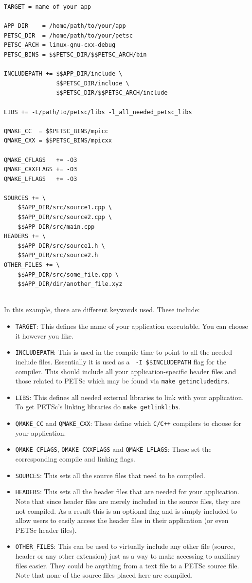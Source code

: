 {{{\begin{lstlisting}
TARGET = name_of_your_app

APP_DIR    = /home/path/to/your/app
PETSC_DIR  = /home/path/to/your/petsc
PETSC_ARCH = linux-gnu-cxx-debug
PETSC_BINS = $$PETSC_DIR/$$PETSC_ARCH/bin

INCLUDEPATH += $$APP_DIR/include \
               $$PETSC_DIR/include \
               $$PETSC_DIR/$$PETSC_ARCH/include

LIBS += -L/path/to/petsc/libs -l_all_needed_petsc_libs

QMAKE_CC  = $$PETSC_BINS/mpicc
QMAKE_CXX = $$PETSC_BINS/mpicxx

QMAKE_CFLAGS   += -O3
QMAKE_CXXFLAGS += -O3
QMAKE_LFLAGS   += -O3

SOURCES += \
	$$APP_DIR/src/source1.cpp \
	$$APP_DIR/src/source2.cpp \
	$$APP_DIR/src/main.cpp
HEADERS += \
	$$APP_DIR/src/source1.h \
	$$APP_DIR/src/source2.h 	
OTHER_FILES += \
	$$APP_DIR/src/some_file.cpp \
	$$APP_DIR/dir/another_file.xyz
	
\end{lstlisting}

In this example, there are different keywords used. These include:
\begin{itemize}
\item \texttt{TARGET}: This defines the name of your application executable. You can choose it however you like.
\item \texttt{INCLUDEPATH}: This is used in the compile time to point to all the needed include files. Essentially it is used as a \texttt{ -I \$\$INCLUDEPATH} flag for the compiler. This should include all your application-specific header files and those related to PETSc which may be found via \texttt{make getincludedirs}.
\item \texttt{LIBS}: This defines all needed external libraries to link with your application. To get PETSc's linking libraries do \texttt{make getlinklibs}.
\item \texttt{QMAKE\_CC} and \texttt{QMAKE\_CXX}: These define which \texttt{C/C++} compilers to choose for your application.
\item \texttt{QMAKE\_CFLAGS}, \texttt{QMAKE\_CXXFLAGS} and \texttt{QMAKE\_LFLAGS}: These set the corresponding compile and linking flags.
\item \texttt{SOURCES}: This sets all the source files that need to be compiled.
\item \texttt{HEADERS}: This sets all the header files that are needed for your application. Note that since header files are merely included in the source files, they are not compiled. As a result this is an optional flag and is simply included to allow users to easily access the header files in their application (or even PETSc header files).
\item \texttt{OTHER\_FILES}: This can be used to virtually include any other file (source, header or any other extension) just as a way to make accessing to auxiliary files easier. They could be anything from a text file to a PETSc source file. Note that none of the source files placed here are compiled.
\end{itemize}

}}}
